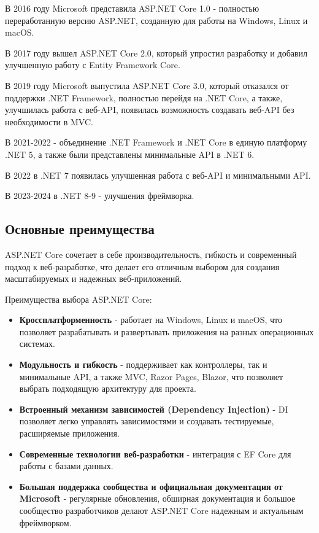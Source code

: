 \documentclass[a4paper,12pt]{report}
\begin{document}
В 2016 году Microsoft представила ASP.NET Core 1.0 - полностью переработанную версию ASP.NET, созданную для работы на Windows, Linux и macOS.

В 2017 году вышел ASP.NET Core 2.0, который упростил разработку и добавил улучшенную работу с Entity Framework Core.

В 2019 году Microsoft выпустила ASP.NET Core 3.0, который отказался от поддержки .NET Framework, полностью перейдя на .NET Core, 
а также, улучшилась работа с веб-\acs{API}, появилась возможность создавать веб-\acs{API} без необходимости в \acs{MVC}.

В 2021-2022 - объединение .NET Framework и .NET Core в единую платформу .NET 5, а также были представлены минимальные \acs{API} в .NET 6.

В 2022 в .NET 7 появилась улучшенная работа с веб-\acs{API} и минимальными \acs{API}.

В 2023-2024 в .NET 8-9 - улучшения фреймворка.

\subsection{Основные преимущества}

ASP.NET Core сочетает в себе производительность, гибкость и современный подход к веб-разработке, что делает его отличным выбором 
для создания масштабируемых и надежных веб-приложений.

Преимущества выбора ASP.NET Core:
\begin{itemize}
    \item
        \textbf{Кроссплатформенность} - работает на Windows, Linux и macOS, что позволяет разрабатывать и развертывать приложения на разных операционных системах.
    \item 
        \textbf{Модульность и гибкость} - поддерживает как контроллеры, так и минимальные \acs{API}, а также \acs{MVC}, Razor Pages, Blazor, что позволяет выбрать 
        подходящую архитектуру для проекта.
    \item
        \textbf{Встроенный механизм зависимостей (Dependency Injection)} - \acs{DI} позволяет легко управлять зависимостями и создавать тестируемые, расширяемые приложения.
    \item
        \textbf{Современные технологии веб-разработки} - интеграция с \acs{EF} Core для работы с базами данных.
    \item
        \textbf{Большая поддержка сообщества и официальная документация от Microsoft} - регулярные обновления, обширная документация и большое сообщество 
        разработчиков делают ASP.NET Core надежным и актуальным фреймворком.
\end{itemize}
\end{document}
